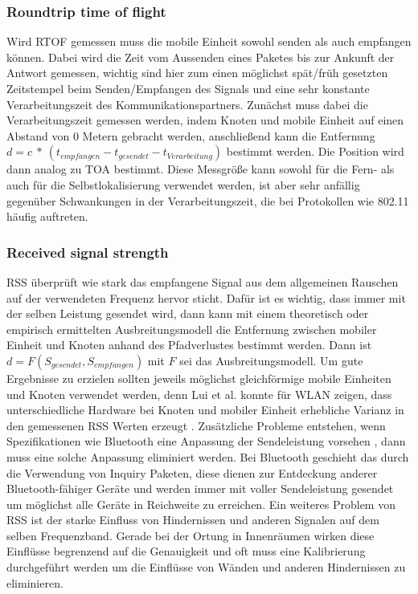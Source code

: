 \subsubsection{Roundtrip time of flight}
Wird RTOF gemessen muss die mobile Einheit sowohl senden als auch empfangen können. Dabei wird die Zeit vom Aussenden eines Paketes bis zur Ankunft der Antwort gemessen, wichtig sind hier zum einen möglichst spät/früh gesetzten Zeitstempel beim Senden/Empfangen des Signals und eine sehr konstante Verarbeitungszeit des Kommunikationspartners. Zunächst muss dabei die Verarbeitungszeit gemessen werden, indem Knoten und mobile Einheit auf einen Abstand von 0 Metern gebracht werden, anschließend kann die Entfernung $d = c\ *\ (t_{empfangen} - t_{gesendet} - t_{Verarbeitung})$ bestimmt werden. Die Position wird dann analog zu TOA bestimmt. Diese Messgröße kann sowohl für die Fern- als auch für die Selbstlokalisierung verwendet werden, ist aber sehr anfällig gegenüber Schwankungen in der Verarbeitungszeit, die bei Protokollen wie 802.11 häufig auftreten. \\

\subsubsection{Received signal strength}
RSS überprüft wie stark das empfangene Signal aus dem allgemeinen Rauschen auf der verwendeten Frequenz hervor sticht. Dafür ist es wichtig, dass immer mit der selben Leistung gesendet wird, dann kann mit einem theoretisch oder empirisch ermittelten Ausbreitungsmodell die Entfernung zwischen mobiler Einheit und Knoten anhand des Pfadverlustes bestimmt werden. Dann ist $d = F(S_{gesendet},S_{empfangen})$ mit $F$ sei das Ausbreitungsmodell. Um gute Ergebnisse zu erzielen sollten jeweils möglichst gleichförmige mobile Einheiten und Knoten verwendet werden, denn Lui et al. konnte für WLAN zeigen, dass unterschiedliche Hardware bei Knoten und mobiler Einheit erhebliche Varianz in den gemessenen RSS Werten erzeugt \cite{lui2011differences}. Zusätzliche Probleme entstehen, wenn Spezifikationen wie Bluetooth eine Anpassung der Sendeleistung vorsehen \cite{hossain2007comprehensive}, dann muss eine solche Anpassung eliminiert werden. 
Bei Bluetooth geschieht das durch die Verwendung von Inquiry Paketen, diese dienen zur Entdeckung anderer Bluetooth-fähiger Geräte und werden immer mit voller Sendeleistung gesendet um möglichst alle Geräte in Reichweite zu erreichen.
Ein weiteres Problem von RSS ist der starke Einfluss von Hindernissen und anderen  Signalen auf dem selben Frequenzband. Gerade bei der Ortung in Innenräumen wirken diese Einflüsse begrenzend auf die Genauigkeit und oft muss eine Kalibrierung durchgeführt werden um die Einflüsse von Wänden und anderen Hindernissen zu eliminieren.













